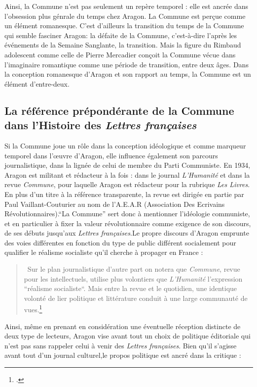 Ainsi, la Commune n'est pas seulement un repère temporel : elle est ancrée dans l'obsession plus génrale du temps chez Aragon. La Commune est perçue comme un élément romanesque. C'est d'ailleurs la transition du temps de la Commune qui semble fasciner Aragon: la défaite de la Commune, c'est-à-dire l'après les événements de la Semaine Sanglante, la transition. Mais la figure du Rimbaud adolescent comme celle de Pierre Mercadier conçoit la Commune vécue dans l'imaginaire romantique comme une période de transition, entre deux âges. Dans la conception romanesque d'Aragon et son rapport au temps, la Commune est un élément d'entre-deux. 
 
\subsection{La référence prépondérante de la Commune dans l'Histoire des \emph{Lettres françaises}}

Si la Commune joue un rôle dans la conception idéologique et comme marqueur temporel dans l'\oe{}uvre d'Aragon, elle influence également son parcours journalistique, dans la lignée de celui de membre du Parti Communiste. En 1934, Aragon est militant et rédacteur à la fois : dans le journal \emph{L'Humanité} et dans la revue \emph{Commune}, pour laquelle Aragon est rédacteur pour la rubrique \emph{Les Livres}. En plus d'un titre à la référence transparente, la revue est dirigée en partie par Paul Vaillant-Couturier au nom de l'A.E.A.R (Association Des Ecrivains Révolutionnaires).\enquote{La Commune} sert donc à mentionner l'idéologie communiste, et en particulier à fixer la valeur révolutionnaire comme exigence de son discours, de ses débuts jusqu'aux \emph{Lettres françaises}.Le propre discours d'Aragon emprunte des voies différentes en fonction du type de public différent socialement pour qualifier le réalisme socialiste qu'il cherche à propager en France : 

\begin{quote}
 Sur le plan journalistique d’autre part on notera que \emph{Commune}, revue pour les intellectuels, utilise plus volontiers que \emph{L’Humanité} l’expression “réalisme socialiste“. Mais entre la revue et le quotidien, une identique volonté de lier politique et littérature conduit à une large communauté de vues.\footcite[p157]{lavoinne}\end{quote}

Ainsi, même en prenant en considération une éventuelle réception distincte de deux type de lecteurs, Aragon vise avant tout un choix de politique éditoriale qui n'est pas sans rappeler celui à venir des \emph{Lettres françaises}. Bien qu'il s'agisse avant tout d'un journal culturel,le propos politique est ancré dans la critique :

